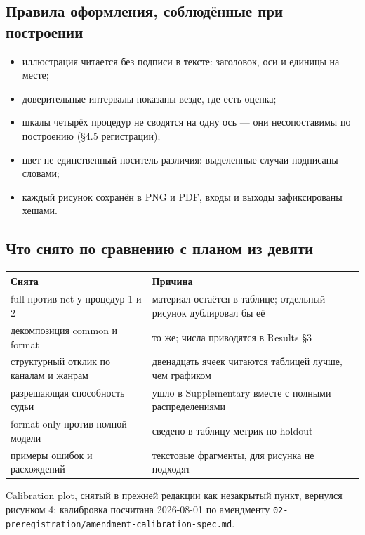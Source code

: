 \documentclass[11pt,a4paper]{article}
\renewcommand{\_}{\textunderscore\allowbreak}
\begin{document}
\subsection{Правила оформления, соблюдённые при построении}

\begin{itemize}
\item иллюстрация читается без подписи в тексте: заголовок, оси и единицы на месте;
\item доверительные интервалы показаны везде, где есть оценка;
\item шкалы четырёх процедур не сводятся на одну ось — они несопоставимы по построению (§4.5 регистрации);
\item цвет не единственный носитель различия: выделенные случаи подписаны словами;
\item каждый рисунок сохранён в PNG и PDF, входы и выходы зафиксированы хешами.
\end{itemize}

\subsection{Что снято по сравнению с планом из девяти}

\begin{center}
\small
\begin{tabularx}{\textwidth}{lX}
\toprule
Снята & Причина \\
\midrule
full против net у процедур 1 и 2 & материал остаётся в таблице; отдельный рисунок дублировал бы её \\
декомпозиция common и format & то же; числа приводятся в Results §3 \\
структурный отклик по каналам и жанрам & двенадцать ячеек читаются таблицей лучше, чем графиком \\
разрешающая способность судьи & ушло в Supplementary вместе с полными распределениями \\
format-only против полной модели & сведено в таблицу метрик по holdout \\
примеры ошибок и расхождений & текстовые фрагменты, для рисунка не подходят \\
\bottomrule
\end{tabularx}
\end{center}

Calibration plot, снятый в прежней редакции как незакрытый пункт, вернулся
рисунком 4: калибровка посчитана 2026-08-01 по амендменту
\texttt{02-\allowbreak{}preregistration/amendment-\allowbreak{}calibration-\allowbreak{}spec.md}.
\end{document}
